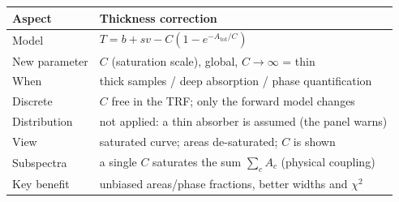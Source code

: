 \begin{center}
\begin{tabular}{@{}ll@{}}
\toprule
\textbf{Aspect} & \textbf{Thickness correction}\\
\midrule
Model & $T=b+s v - C(1-e^{-A_{\text{tot}}/C})$ \\
New parameter & $C$ (saturation scale), global, $C\to\infty$ = thin\\
When & thick samples / deep absorption / phase quantification\\
Discrete & $C$ free in the TRF; only the forward model changes\\
Distribution & not applied: a thin absorber is assumed (the panel warns)\\
View & saturated curve; areas de-saturated; $C$ is shown\\
Subspectra & a single $C$ saturates the sum $\sum_c A_c$ (physical coupling)\\
Key benefit & unbiased areas/phase fractions, better widths and $\chi^2$\\
\bottomrule
\end{tabular}
\end{center}
